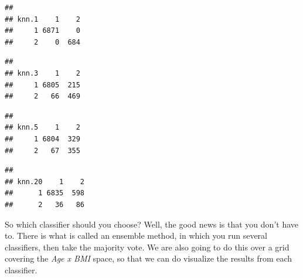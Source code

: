\documentclass[
]{article}
\newenvironment{Shaded}{\begin{snugshade}}{\end{snugshade}}
\newcommand{\FloatTok}[1]{\textcolor[rgb]{0.00,0.00,0.81}{#1}}
\newcommand{\FunctionTok}[1]{\textcolor[rgb]{0.00,0.00,0.00}{#1}}
\newcommand{\NormalTok}[1]{#1}
\newcommand{\SpecialCharTok}[1]{\textcolor[rgb]{0.00,0.00,0.00}{#1}}
\begin{document}
\begin{verbatim}
##      
## knn.1    1    2
##     1 6871    0
##     2    0  684
\end{verbatim}

\begin{Shaded}
\end{Shaded}

\begin{verbatim}
##      
## knn.3    1    2
##     1 6805  215
##     2   66  469
\end{verbatim}

\begin{Shaded}
\end{Shaded}

\begin{verbatim}
##      
## knn.5    1    2
##     1 6804  329
##     2   67  355
\end{verbatim}

\begin{Shaded}
\end{Shaded}

\begin{verbatim}
##       
## knn.20    1    2
##      1 6835  598
##      2   36   86
\end{verbatim}

So which classifier should you choose? Well, the good news is that you
don't have to. There is what is called an ensemble method, in which you
run several classifiers, then take the majority vote. We are also going
to do this over a grid covering the \emph{Age x BMI} space, so that we
can do visualize the results from each classifier.
\end{document}
